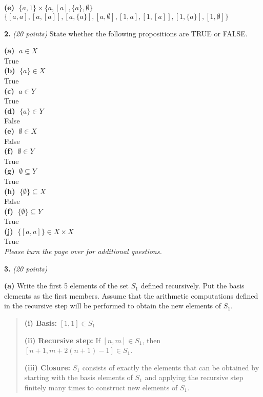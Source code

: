 \documentclass[12pt]{article}
\begin{document}
  {\bf (e) } $\; \{a,1\} \times \{ a, [a], \{a\}, \emptyset \} $ \\
$ \{[a,a],[a,[a]],[a,\{a\}],[a,\emptyset],[1,a],[1,[a]],[1,\{a\}],[1,\emptyset]\} $

\vspace{0.1in}

{\bf 2.} {\em (20 points)} State whether the following propositions are
TRUE or FALSE.


  {\bf (a) } $\; a \in X$\\
True\\
  {\bf (b) } $\; \{a\} \in X$\\
True\\
  {\bf (c) } $\; a \in Y$\\
True\\
  {\bf (d) } $\; \{a\} \in Y$\\
False\\
  {\bf (e) } $\; \emptyset \in X$\\
False\\
  {\bf (f) } $\; \emptyset \in Y$\\
True\\
  {\bf (g) } $\; \emptyset \subseteq Y$\\
True\\
  {\bf (h) } $\; \{ \emptyset \} \subseteq X$\\
False\\
  {\bf (f) } $\; \{ \emptyset \} \subseteq Y$\\
True\\
  {\bf (j) } $\; \{[a,a]\} \in X \times X$ \\
True\\

\hfill {\em Please turn the page over for additional questions. }
\newpage

{\bf 3.} {\em (20 points)} 

{\bf (a) }
Write the first 5 elements of the set $S_1$ defined recursively.
Put the basis elements as the first members.
Assume that the arithmetic computations defined in the recursive step 
will be performed to obtain the new elements of $S_1$.

\begin{quote}
{\bf (i) Basis:} $[1,1] \in S_1$

{\bf (ii) Recursive step:} If $[n,m] \in S_1$, then
$[n+1, m+ 2(n+1)- 1 ] \in S_1$.

{\bf (iii) Closure:} $S_1$ consists of exactly the elements that can be
obtained by starting with the basis elements of $S_1$ and applying the
recursive step finitely many times to construct new elements of $S_1$.
\end{quote}
\end{document}
